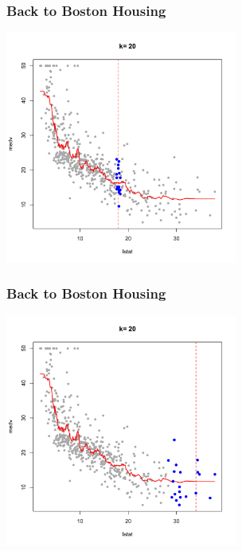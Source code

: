 \documentclass[flegn]{beamer}
\begin{document}
\begin{frame}
\frametitle{Back to Boston Housing}

\vspace{-0.7cm}
\begin{center}
\includegraphics[width=3in]{k20-5}
\end{center}
\end{frame}
\begin{frame}
\frametitle{Back to Boston Housing}
\vspace{-0.7cm}
\begin{center}
\includegraphics[width=3in]{k20-6}
\end{center}
\end{frame}
\end{document}
